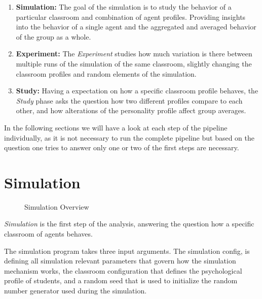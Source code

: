 \begin{enumerate}
    \item \textbf{Simulation:} The goal of the simulation is to study the behavior
    of a particular classroom and combination of agent profiles. Providing insights
    into the behavior of a single agent and the aggregated and averaged behavior of
    the group as a whole.
    \item \textbf{Experiment:} The \textit{Experiment} studies how much variation
    is there between multiple runs of the simulation of the same classroom,
    slightly changing the classroom profiles and random elements of the simulation.
    \item \textbf{Study:} Having a expectation on how a specific classroom profile
    behaves, the \textit{Study} phase asks the question how two different profiles
    compare to each other, and how alterations of the personality profile affect
    group averages.
\end{enumerate}

In the following sections we will have a look at each step of the pipeline individually,
as it is not necessary to run the complete pipeline but based on the question
one tries to answer only one or two of the first steps are necessary.


\section{Simulation}

\begin{figure}[H]
    \caption{Simulation Overview}
    \label{SimulationOverview}
    \hspace*{-4.0\leftmargin}
\end{figure}

\textit{Simulation} is the first step of the analysis, answering the question how
a specific classroom of agents behaves.

The simulation program takes three input arguments. The simulation config,
is defining all simulation relevant parameters that govern how the simulation mechanism
works, the classroom configuration that defines the psychological profile of students,
and a random seed that is used to initialize the random number generator used during
the simulation.

